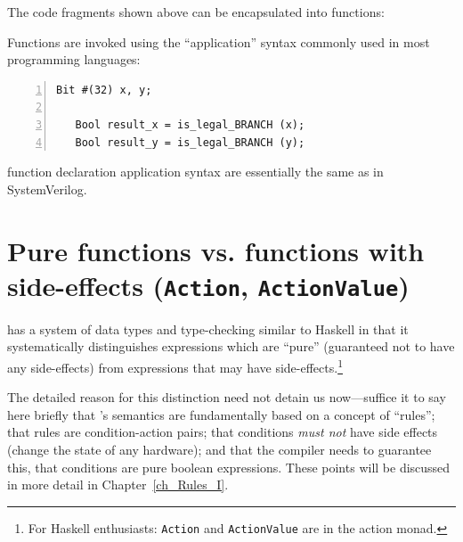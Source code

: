 \label{BSV_functions_2}

The code fragments shown above can be encapsulated into {\BSV}
functions:



Functions are invoked using the ``application'' syntax commonly used
in most programming languages:

{\footnotesize
\begin{Verbatim}[frame=single, numbers=left]
   Bit #(32) x, y;

   Bool result_x = is_legal_BRANCH (x);
   Bool result_y = is_legal_BRANCH (y);
\end{Verbatim}
}

{\BSV} function declaration application syntax are essentially the
same as in SystemVerilog.





\section{Pure functions vs. functions with side-effects ({\tt Action}, {\tt ActionValue})}

\label{Sec_Pure_vs_Side_Effect_functions}


{\BSV} has a system of data types and type-checking similar to Haskell
in that it systematically distinguishes expressions which are ``pure''
(guaranteed not to have any side-effects) from expressions that may
have side-effects.\footnote{For Haskell enthusiasts: {\tt Action} and
{\tt ActionValue} are in the action monad.}

The detailed reason for this distinction need not detain us
now---suffice it to say here briefly that {\BSV}'s semantics are
fundamentally based on a concept of ``rules''; that rules are
condition-action pairs; that conditions \emph{must not} have side
effects (change the state of any hardware); and that the compiler
needs to guarantee this, {\ie} that conditions are pure boolean
expressions.  These points will be discussed in more detail in
Chapter~\ref{ch_Rules_I}.


